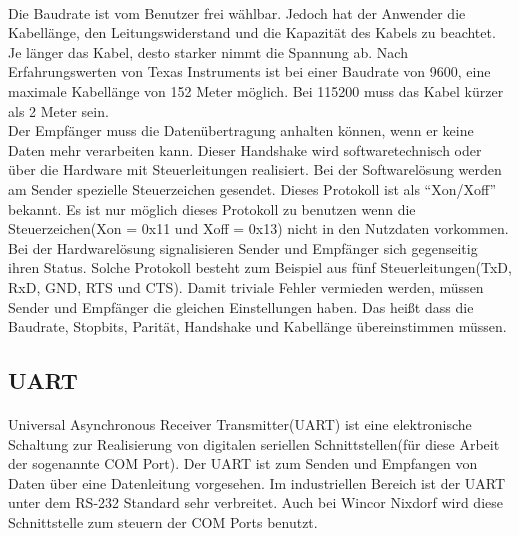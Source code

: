 \paragraph{}
Die Baudrate ist vom Benutzer frei wählbar. Jedoch hat der Anwender die Kabellänge, den Leitungswiderstand und die Kapazität des Kabels zu beachtet. Je länger das Kabel, desto starker nimmt die Spannung ab. Nach Erfahrungswerten von Texas Instruments ist bei einer Baudrate von 9600, eine maximale Kabellänge von 152 Meter möglich. Bei 115200 muss das Kabel kürzer als 2 Meter sein.\\

Der Empfänger muss die Datenübertragung anhalten können, wenn er keine Daten mehr verarbeiten kann. Dieser Handshake wird softwaretechnisch oder über die Hardware mit Steuerleitungen realisiert. Bei der Softwarelösung werden am Sender spezielle Steuerzeichen gesendet. Dieses Protokoll ist als "`Xon/Xoff"' bekannt. Es ist nur möglich dieses Protokoll zu benutzen wenn die Steuerzeichen(Xon = 0x11 und Xoff = 0x13) nicht in den Nutzdaten vorkommen. Bei der Hardwarelösung signalisieren Sender und Empfänger sich gegenseitig ihren Status. Solche Protokoll besteht zum Beispiel aus fünf Steuerleitungen(TxD, RxD, GND, RTS und CTS). Damit triviale Fehler vermieden werden, müssen Sender und Empfänger die gleichen Einstellungen haben. Das heißt dass die Baudrate, Stopbits, Parität, Handshake und Kabellänge übereinstimmen müssen.


\subsection{UART}
\paragraph{}
Universal Asynchronous Receiver Transmitter(UART) ist eine elektronische Schaltung zur Realisierung von digitalen seriellen Schnittstellen(für diese Arbeit der sogenannte COM Port). Der UART ist zum Senden und Empfangen von Daten über eine Datenleitung vorgesehen. Im industriellen Bereich ist der UART unter dem RS-232 Standard sehr verbreitet. Auch bei Wincor Nixdorf wird diese Schnittstelle zum steuern der COM Ports benutzt.

